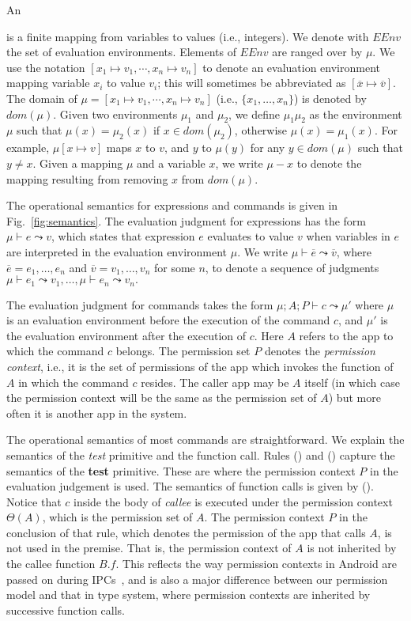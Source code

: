 An {
is a finite mapping from variables to values (i.e., integers).
We denote with $EEnv$ the set of evaluation environments.
Elements of $EEnv$ are ranged over by $\mu$.
We  use the notation
$[ x_1 \mapsto v_1, \cdots,  x_n \mapsto v_n]$
to denote an evaluation environment mapping variable $x_i$ to value $v_i$; this will sometimes be abbreviated as $[ \overline x \mapsto \overline v ].$
The domain of $\mu = [ x_1 \mapsto v_1, \cdots, x_n \mapsto v_n]$ (i.e., $\{x_1,\dots,x_n\}$) is denoted by $dom(\mu)$.
Given two environments $\mu_1$ and $\mu_2$, we define
$\mu_1\mu_2$ as the environment $\mu$ such that $\mu(x) = \mu_2(x)$ if $x \in dom(\mu_2)$,
otherwise $\mu(x) =\mu_1(x)$.
For example, $\mu[x \mapsto v]$ maps $x$ to $v$, and $y$ to $\mu(y)$
for any $y \in dom(\mu)$ such that $y \not = x.$
Given a mapping $\mu$ and a variable $x$, we write $\mu\!-\!x$ to denote the
mapping resulting from removing $x$ from $dom(\mu)$.

The operational semantics for expressions and commands is
given in Fig.~\ref{fig:semantics}.
The evaluation judgment
for expressions has the form $\mu\vdash e\leadsto v$,
which states that expression $e$ evaluates to value $v$ when variables
in $e$ are interpreted in the evaluation environment $\mu.$
We write $\mu \vdash \overline{e} \leadsto \overline{v}$,
where $\overline{e}=e_1,\dots,e_n$ and $\overline{v} = v_1,\dots,v_n$ for some $n$,
to denote a sequence of judgments
$\mu \vdash e_1 \leadsto v_1, \ldots, \mu \vdash e_n \leadsto v_n.$

The evaluation judgment for commands takes the form
$\mu;A;P\vdash c \leadsto \mu'$
where $\mu$ is an evaluation environment before the execution
of the command $c$, and $\mu'$ is the evaluation environment
after the execution of $c$. Here $A$ refers to the app to which the command $c$ belongs.
The permission set $P$ denotes the {\em permission context}, i.e., it is the set of permissions of the app which invokes the function of $A$ in which the command $c$ resides. The caller
app may be $A$ itself (in which case the permission context will be the same as the permission set of $A$) but more often it is another app in the system.

The operational semantics of most commands are straightforward.
We explain the semantics of the \emph{test} primitive and the function call.
Rules () and () capture the semantics of the \textbf{test} primitive.
These are where the permission context $P$ in the evaluation judgement is used.
The semantics of function calls is given by (). 
 Notice that $c$ inside the body of \emph{callee} is executed under
the permission context $\Theta(A)$, which is the permission set of $A$. The permission context $P$
in the conclusion of that rule, which denotes the permission of the app that calls $A$, 
is not used in the premise. That is, the permission context of $A$ is not inherited by 
the callee function $B.f$. This reflects the way permission contexts in Android
are passed on during IPCs~\cite{Android-CheckPerm,Android-Binder-IPC}, and is also a major difference
between our permission model and that in {\BN} type system,
where permission contexts are inherited by successive function calls.

}
